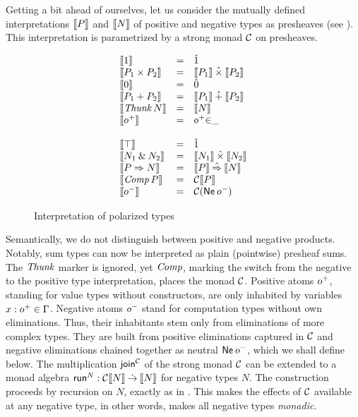 \documentclass[sigconf,screen,fleqn]{acmart} %
\begin{document}
Getting a bit ahead of ourselves, let us consider the
mutually defined interpretations
$\den P$ and $\den N$ of positive and negative types as presheaves
(see ).
This interpretation is parametrized by a strong monad $\C$ on
presheaves.
\begin{figure}[htbp]
\centering
\hrulefill
$$
\begin{array}{lcl}
  \den{\tyone} & = & \hatone \\
  \den{P_1 \times P_2} & = & \den{P_1} \hattimes \den{P_2} \\
  \den{\tyzero} & = & \hatzero \\
  \den{P_1 + P_2} & = & \den{P_1} \hatplus \den{P_2} \\
  \den{\Thunk N} & = & \den N \\
  \den{\patom} & = & \patom{\in}\_ \\
\\
  \den{\top} & = & \hatone \\
  \den{N_1 \ntimes N_2} & = & \den{N_1} \hattimes \den{N_2} \\
  \den{P \To N} & = & \den P \hatto \den N \\
  \den{\Comp P} & = & \C \den P \\
  \den{\natom}  & = & \C (\tNe\, \natom) \\
\end{array}
$$
\hrulefill
  \caption{Interpretation of polarized types}
  \label{fig:tyint}
\end{figure}
Semantically, we do not distinguish between positive and negative
products.  Notably, sum types can now be interpreted as plain
(pointwise) presheaf
sums.  The $\tThunk$ marker is ignored, yet $\tComp$, marking the
switch from the negative to the positive type interpretation, places
the monad $\C$.  Positive atoms $\patom$, standing for value types without
constructors, are only inhabited by variables $x : \patom \in \Gamma$.
Negative atoms $\natom$ stand for computation types without own eliminations.
Thus, their inhabitants stem only from eliminations of more complex
types.  They are built from positive eliminations captured in $\C$ and negative
eliminations chained together as neutral $\tNe\,\natom$, which we
shall define below.
The multiplication $\tjoin[\C]$ of the strong monad $\C$ can be
extended to a monad algebra %
$\trun^N : \C \den N \todot \den N$ for negative types $N$.
The construction proceeds by recursion on $N$, exactly as in .
This makes the effects of $\C$ available at any negative type,
in other words, makes all negative types \emph{monadic}.
\end{document}
